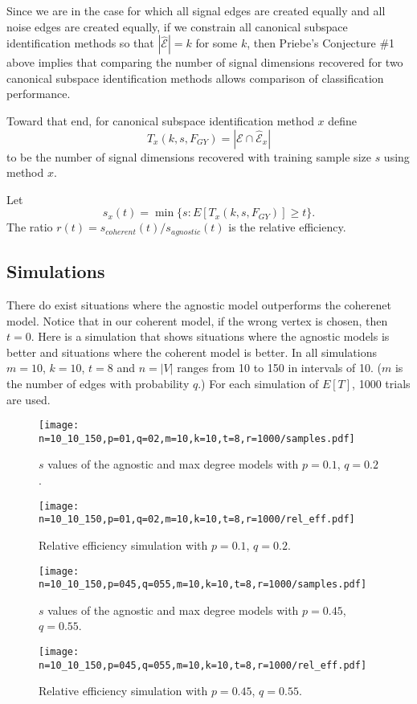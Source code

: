 \documentclass{article}
\begin{document}
Since we are in the case for which all signal edges are created equally and all noise edges are created equally, if we constrain all canonical subspace identification methods so that $|\hat{\mathcal{E}}| = k$ for some $k$, then Priebe’s Conjecture \#1 above implies that comparing the number of signal dimensions recovered for two canonical subspace identification methods allows comparison of classification performance.

Toward that end, for canonical subspace identification method $x$ define
\[
                            T_x (k, s, F_{GY} ) = |\mathcal{E} \cap \hat{\mathcal{E}}_x |
\]
to be the number of signal dimensions recovered with training sample size $s$
using method $x$.

Let
\[
    s_x(t) = \min\{s : E[T_x (k, s, F_{GY} )] \geq t\}.
\]
The ratio $r(t) = s_{coherent} (t)/s_{agnostic} (t)$ is the relative efficiency.


\subsection{Simulations}

There do exist situations where the agnostic model outperforms the coherenet model. Notice that in our coherent model, if the wrong vertex is chosen, then $t=0$. Here is a simulation that shows situations where the agnostic models is better and situations where the coherent model is better. In all simulations $m=10$, $k=10$, $t=8$ and $n=|V|$ ranges from 10 to 150 in intervals of 10. ($m$ is the number of edges with probability $q$.) For each simulation of $E[T]$, 1000 trials are used.

\begin{figure}[h]
\centering
\texttt{[image: n=10\_10\_150,p=01,q=02,m=10,k=10,t=8,r=1000/samples.pdf]}
\caption{$s$ values of the agnostic and max degree models with $p=0.1$, $q=0.2$.}
\label{fig:p01_q02_s_val}
\end{figure}
\begin{figure}[h]
\centering
\texttt{[image: n=10\_10\_150,p=01,q=02,m=10,k=10,t=8,r=1000/rel\_eff.pdf]}
\caption{Relative efficiency simulation with $p=0.1$, $q=0.2$.}
\label{fig:p01_q02_rel_eff}
\end{figure}

\begin{figure}[h]
\centering
\texttt{[image: n=10\_10\_150,p=045,q=055,m=10,k=10,t=8,r=1000/samples.pdf]}
\caption{$s$ values of the agnostic and max degree models with $p=0.45$, $q=0.55$.}
\label{fig:p045_q055_s_val}
\end{figure}
\begin{figure}[h]
\centering
\texttt{[image: n=10\_10\_150,p=045,q=055,m=10,k=10,t=8,r=1000/rel\_eff.pdf]}
\caption{Relative efficiency simulation with $p=0.45$, $q=0.55$.}
\label{fig:p045_q055_rel_eff}
\end{figure}
\end{document}
